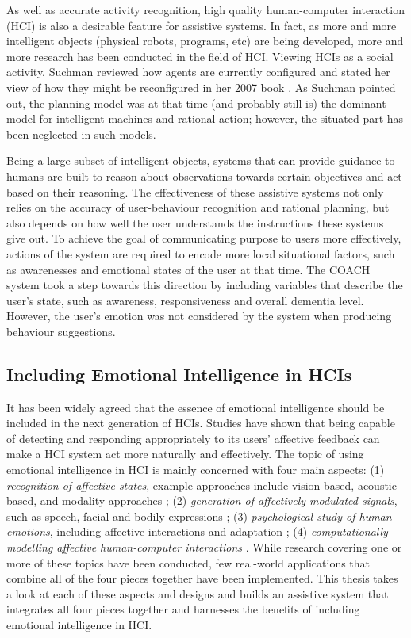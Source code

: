 As well as accurate activity recognition, high quality human-computer interaction (HCI) is also a desirable feature for assistive systems. In fact, as more and more intelligent objects (physical robots, programs, etc) are being developed, more and more research has been conducted in the field of HCI. Viewing HCIs as a social activity, Suchman reviewed how agents are currently configured and stated her view of how they might be reconfigured in her 2007 book \cite{suchman2007human}. As Suchman pointed out, the planning model was at that time (and probably still is) the dominant model for intelligent machines and rational action; however, the situated part has been neglected in such models.

Being a large subset of intelligent objects, systems that can provide guidance to humans are built to reason about observations towards certain objectives and act based on their reasoning. The effectiveness of these assistive systems not only relies on the accuracy of user-behaviour recognition and rational planning, but also depends on how well the user understands the instructions these systems give out. To achieve the goal of communicating purpose to users more effectively, actions of the system are required to encode more local situational factors, such as awarenesses and emotional states of the user at that time. The COACH system \cite{hoey2010automated} took a step towards this direction by including variables that describe the user's state, such as awareness, responsiveness and overall dementia level. However, the user's emotion was not considered by the system when producing behaviour suggestions.

\subsection{Including Emotional Intelligence in HCIs}

It has been widely agreed that the essence of emotional intelligence should be included in the next generation of HCIs. Studies have shown that being capable of detecting and responding appropriately to its users' affective feedback can make a HCI system act more naturally and effectively. The topic of using emotional intelligence in HCI is mainly concerned with four main aspects: (1) \textit{recognition of affective states}, example approaches include vision-based, acoustic-based, and modality approaches \cite{pantic2003toward, zeng2009survey}; (2) \textit{generation of affectively modulated signals}, such as speech, facial and bodily expressions \cite{cassell2000embodied, niewiadomski2013computational}; (3) \textit{psychological study of human emotions}, including affective interactions and adaptation \cite{scholl2013socio}; (4) \textit{computationally modelling affective human-computer interactions} \cite{hoey2013bayesian, pynadath2005psychsim, el2000flame, conati2009empirically}. While research covering one or more of these topics have been conducted, few real-world applications that combine all of the four pieces together have been implemented. This thesis takes a look at each of these aspects and designs and builds an assistive system that integrates all four pieces together and harnesses the benefits of including emotional intelligence in HCI.

